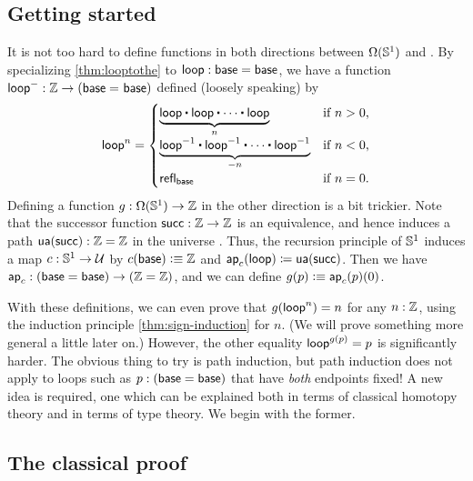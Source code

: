 \subsection{Getting started}
\label{sec:pi1s1-initial-thoughts}

It is not too hard to define functions in both directions between $\Omega(\mathbb{S}^1)$ and \Z.
By specializing \autoref{thm:looptothe} to $\mathsf{loop}:\mathsf{base}=\mathsf{base}$, we have a function $\mathsf{loop}^- : \mathbb{Z} \rightarrow (\mathsf{base} =_{} \mathsf{base})$ defined (loosely speaking) by
\[
  \lloop^n =
  \begin{cases}
    \underbrace{\lloop \ct \lloop \ct \cdots \ct \lloop}_{n}  & \text{if $n > 0$,} \\
    \underbrace{\opp \lloop \ct \opp \lloop \ct \cdots \ct \opp \lloop}_{-n} & \text{if $n < 0$,} \\
    \refl{\base} & \text{if $n = 0$.}
\end{cases}
\]
%
Defining a function $g:\Omega(\mathbb{S}^1)\to\mathbb{Z}$ in the other direction is a bit trickier.
Note that the successor function $\mathsf{succ}:\mathbb{Z}\to\mathbb{Z}$ is an equivalence,
%
and hence induces a path $\mathsf{ua}(\mathsf{succ}):\mathbb{Z}=\mathbb{Z}$ in the universe \type.
Thus, the recursion principle of $\mathbb{S}^1$ induces a map $c:\mathbb{S}^1\to\mathcal{U}$ by $c(\mathsf{base})\vcentcolon\equiv \mathbb{Z}$ and $\mathsf{ap}_{c} (\mathsf{loop}) \coloneqq \mathsf{ua}(\mathsf{succ})$.
Then we have $\mathsf{ap}_{c} : (\mathsf{base}=\mathsf{base}) \to (\mathbb{Z}=\mathbb{Z})$, and we can define $g(p)\vcentcolon\equiv \mathsf{ap}_{c}(p)(0)$.

With these definitions, we can even prove that $g(\mathsf{loop}^n)=n$ for any $n:\mathbb{Z}$, using the induction principle \autoref{thm:sign-induction} for $n$.
(We will prove something more general a little later on.)
However, the other equality $\mathsf{loop}^{g(p)}=p$ is significantly harder.
The obvious thing to try is path induction, but path induction does not apply to loops such as $p:(\mathsf{base}=\mathsf{base})$ that have \emph{both} endpoints fixed!
A new idea is required, one which can be explained both in terms of classical homotopy theory and in terms of type theory.
We begin with the former.


\subsection{The classical proof}
\label{sec:pi1s1-classical-proof}

